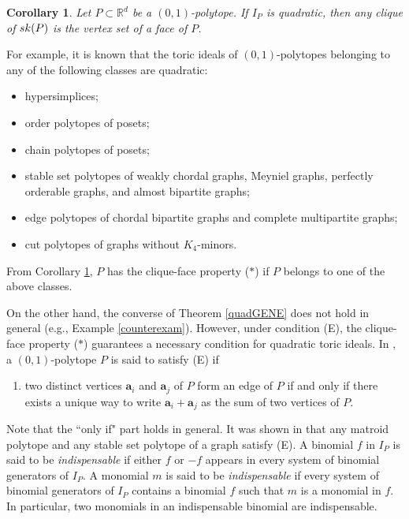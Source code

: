 \documentclass[10pt,a4paper]{amsart}
\newtheorem{cor}[thm]{Corollary}
\numberwithin{thm}{section}
\numberwithin{equation}{section}
\def\NZQ{\mathbb}               %
\def\RR{{\NZQ R}}
\def\ab{{\mathbf a}}
\begin{document}
\begin{cor}\label{zero_one}
    Let $P \subset \RR^d$ be a $(0,1)$-polytope.
If $I_P$ is quadratic,
    then any clique of ${\rm sk}(P)$ is the vertex set of a face of $P$.
\end{cor}

For example, it is known that the toric ideals of $(0,1)$-polytopes belonging to any of the following classes are quadratic:
\begin{itemize}
\item 
hypersimplices;
    \item 
    order polytopes of posets;
    \item
    chain polytopes of posets;
    \item 
    stable set polytopes of weakly chordal graphs, Meyniel graphs,
    perfectly orderable graphs, and almost bipartite graphs;
    \item 
    edge polytopes of chordal bipartite graphs and complete multipartite graphs;
    \item 
    cut polytopes of graphs without $K_4$-minors.
\end{itemize}
From Corollary \ref{zero_one}, $P$ has the clique-face property ($*$) if $P$ belongs to one of the above classes.


On the other hand, the converse of Theorem \ref{quadGENE} does not hold in general (e.g., Example \ref{counterexam}).
However, under condition (E), the clique-face property ($*$) guarantees a necessary condition for quadratic toric ideals.
In \cite{propertyE}, a $(0,1)$-polytope $P$ is said to satisfy (E) if 

\medskip

\begin{enumerate}
    \item[(E)] 
 two distinct vertices $\ab_i$ and $\ab_j$ of $P$ form an edge of $P$ if and only if
 there exists a unique way to write $\ab_i+\ab_j$ as the sum of two vertices of $P$.
\end{enumerate}
    
\medskip

\noindent
Note that the ``only if" part holds in general.
 It was shown in \cite{propertyE} that any matroid polytope
 and any stable set polytope of a graph satisfy (E).
A binomial $f$ in $I_P$ is said to be {\it indispensable}
if either $f$ or $-f$ appears in every system of binomial generators of $I_P$.
 A monomial $m$ is said to be {\it indispensable} if every system of binomial generators of $I_P$ 
 contains a binomial $f$ such that $m$ is a monomial in $f$.
 In particular, two monomials in an indispensable binomial are indispensable.
\end{document}
